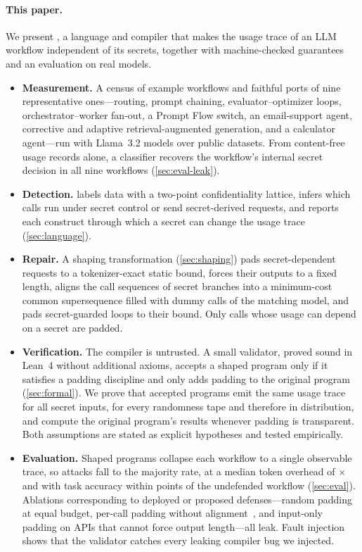 \paragraph{This paper.} We present \sys, a language and compiler that makes the usage trace of an LLM workflow independent of its secrets, together with machine-checked guarantees and an evaluation on real models.
\begin{itemize}
\item \textbf{Measurement.} A census of \censusRows{} example workflows and faithful ports of nine representative ones---routing, prompt chaining, evaluator--optimizer loops, orchestrator--worker fan-out, a Prompt Flow switch, an email-support agent, corrective and adaptive retrieval-augmented generation, and a calculator agent---run with Llama~3.2 models over public datasets. From content-free usage records alone, a classifier recovers the workflow's internal secret decision in all nine workflows (\cref{sec:eval-leak}).
\item \textbf{Detection.} \sys labels data with a two-point confidentiality lattice, infers which calls run under secret control or send secret-derived requests, and reports each construct through which a secret can change the usage trace (\cref{sec:language}).
\item \textbf{Repair.} A shaping transformation (\cref{sec:shaping}) pads secret-dependent requests to a tokenizer-exact static bound, forces their outputs to a fixed length, aligns the call sequences of secret branches into a minimum-cost common supersequence filled with dummy calls of the matching model, and pads secret-guarded loops to their bound. Only calls whose usage can depend on a secret are padded.
\item \textbf{Verification.} The compiler is untrusted. A small validator, proved sound in Lean~4 without additional axioms, accepts a shaped program only if it satisfies a padding discipline and only adds padding to the original program (\cref{sec:formal}). We prove that accepted programs emit the same usage trace for all secret inputs, for every randomness tape and therefore in distribution, and compute the original program's results whenever padding is transparent. Both assumptions are stated as explicit hypotheses and tested empirically.
\item \textbf{Evaluation.} Shaped programs collapse each workflow to a single observable trace, so attacks fall to the majority rate, at a median token overhead of \resOverheadMedian$\times$ and with task accuracy within \resFuncMaxDrop{} points of the undefended workflow (\cref{sec:eval}). Ablations corresponding to deployed or proposed defenses---random padding at equal budget, per-call padding without alignment~\cite{zhang2024timewilltell}, and input-only padding on APIs that cannot force output length---all leak. Fault injection shows that the validator catches every leaking compiler bug we injected.
\end{itemize}

